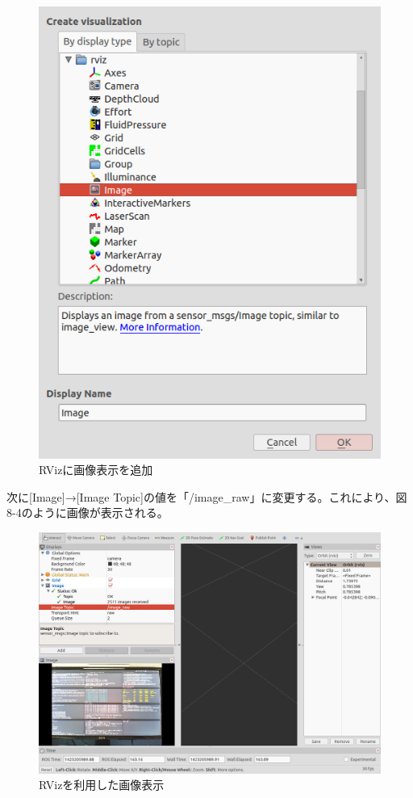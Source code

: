 \begin{figure}[ht]
  \centering
  \includegraphics[width=\columnwidth]{pictures/chapter8/pic_08_03.png}
  \caption{RVizに画像表示を追加}
\end{figure}

次に[Image]→[Image Topic]の値を「/image\_raw」に変更する。これにより、図8-4のように画像が表示される。

\begin{figure}[ht]
  \centering
  \includegraphics[width=\columnwidth]{pictures/chapter8/pic_08_04.png}
  \caption{RVizを利用した画像表示}
\end{figure}

